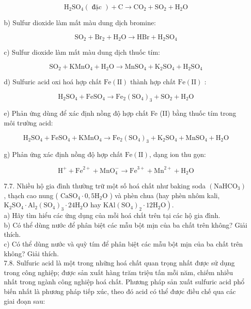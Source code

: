 \documentclass[10pt]{article}
\begin{document}
$$
\mathrm{H}_{2} \mathrm{SO}_{4}(\text { đặc })+\mathrm{C} \rightarrow \mathrm{CO}_{2}+\mathrm{SO}_{2}+\mathrm{H}_{2} \mathrm{O}
$$

b) Sulfur dioxide làm mất màu dung dịch bromine:

$$
\mathrm{SO}_{2}+\mathrm{Br}_{2}+\mathrm{H}_{2} \mathrm{O} \rightarrow \mathrm{HBr}+\mathrm{H}_{2} \mathrm{SO}_{4}
$$

c) Sulfur dioxide làm mất màu dung dịch thuốc tím:

$$
\mathrm{SO}_{2}+\mathrm{KMnO}_{4}+\mathrm{H}_{2} \mathrm{O} \rightarrow \mathrm{MnSO}_{4}+\mathrm{K}_{2} \mathrm{SO}_{4}+\mathrm{H}_{2} \mathrm{SO}_{4}
$$

d) Sulfuric acid oxi hoá hợp chất $\mathrm{Fe}(\mathrm{II})$ thành hợp chất $\mathrm{Fe}(\mathrm{II})$ :

$$
\mathrm{H}_{2} \mathrm{SO}_{4}+\mathrm{FeSO}_{4} \rightarrow \mathrm{Fe}_{2}\left(\mathrm{SO}_{4}\right)_{3}+\mathrm{SO}_{2}+\mathrm{H}_{2} \mathrm{O}
$$

e) Phản ứng dùng để xác định nồng độ hợp chất Fe (II) bằng thuốc tím trong môi trường acid:

$$
\mathrm{H}_{2} \mathrm{SO}_{4}+\mathrm{FeSO}_{4}+\mathrm{KMnO}_{4} \rightarrow \mathrm{Fe}_{2}\left(\mathrm{SO}_{4}\right)_{3}+\mathrm{K}_{2} \mathrm{SO}_{4}+\mathrm{MnSO}_{4}+\mathrm{H}_{2} \mathrm{O}
$$

g) Phản ứng xác định nồng độ hợp chất $\mathrm{Fe}(\mathrm{II})$, dạng ion thu gọn:

$$
\mathrm{H}^{+}+\mathrm{Fe}^{2+}+\mathrm{MnO}_{4}^{-} \rightarrow \mathrm{Fe}^{3+}+\mathrm{Mn}^{2+}+\mathrm{H}_{2} \mathrm{O}
$$

7.7. Nhiều hộ gia đình thường trữ một số hoá chất như baking soda $\left(\mathrm{NaHCO}_{3}\right)$, thạch cao nung ( $\mathrm{CaSO}_{4} \cdot 0,5 \mathrm{H}_{2} \mathrm{O}$ ) và phèn chua (hay phèn nhôm kali, $\mathrm{K}_{2} \mathrm{SO}_{4} \cdot \mathrm{Al}_{2}\left(\mathrm{SO}_{4}\right)_{3} \cdot 24 \mathrm{H}_{2} \mathrm{O}$ hay $\left.\mathrm{KAl}\left(\mathrm{SO}_{4}\right)_{2} \cdot 12 \mathrm{H}_{2} \mathrm{O}\right)$.\\
a) Hãy tìm hiểu các ứng dụng của mỗi hoá chất trên tại các hộ gia đình.\\
b) Có thể dùng nước để phân biệt các mẫu bột mịn của ba chất trên không? Giải thích.\\
c) Có thể dùng nước và quỳ tím để phân biệt các mẫu bột mịn của ba chất trên không? Giải thích.\\
7.8. Sulfuric acid là một trong những hoá chất quan trọng nhất được sử dụng trong công nghiệp; được sản xuất hàng trăm triệu tấn mỗi năm, chiếm nhiều nhất trong ngành công nghiệp hoá chất. Phương pháp sản xuất sulfuric acid phổ biến nhất là phương pháp tiếp xúc, theo đó acid có thể được điều chế qua các giai đoạn sau:
\end{document}
